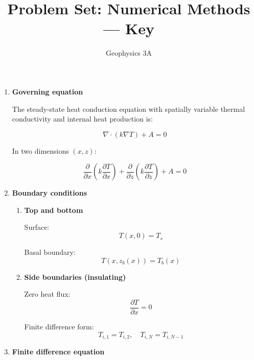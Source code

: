 \documentclass[final,a4paper,12pt]{article}
\title{Problem Set: Numerical Methods --- Key}
\author{Geophysics 3A}
\date{}
\begin{document}
\maketitle

\begin{enumerate}

\item \textbf{Governing equation}

The steady-state heat conduction equation with spatially variable thermal
conductivity and internal heat production is:

\begin{equation}
\nabla \cdot (k \nabla T) + A = 0
\end{equation}

In two dimensions $(x,z)$:

\begin{equation}
\frac{\partial}{\partial x} \left( k \frac{\partial T}{\partial x} \right)
+
\frac{\partial}{\partial z} \left( k \frac{\partial T}{\partial z} \right)
+ A = 0
\end{equation}

\item \textbf{Boundary conditions}

\begin{enumerate}

\item \textbf{Top and bottom}

Surface:
\begin{equation}
T(x,0) = T_s
\end{equation}

Basal boundary:
\begin{equation}
T(x,z_b(x)) = T_b(x)
\end{equation}

\item \textbf{Side boundaries (insulating)}

Zero heat flux:
\begin{equation}
\frac{\partial T}{\partial x} = 0
\end{equation}

Finite difference form:
\begin{equation}
T_{i,1} = T_{i,2}, \quad
T_{i,N} = T_{i,N-1}
\end{equation}

\end{enumerate}

\item \textbf{Finite difference equation}


\end{enumerate}
\end{document}

